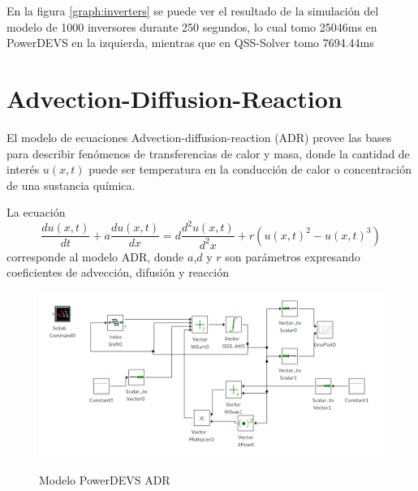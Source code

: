 En la figura \ref{graph:inverters} se puede ver el resultado de la simulación del modelo de 1000 inversores durante 250 segundos, lo cual tomo 25046ms en PowerDEVS en 
	la izquierda, mientras que en QSS-Solver tomo 7694.44ms	

\section{Advection-Diffusion-Reaction}
	El modelo de ecuaciones Advection-diffusion-reaction (ADR) provee las bases para describir fenómenos de transferencias de calor y masa, donde la cantidad de interés $u(x,t)$ puede ser temperatura en la conducción de calor o concentración de una sustancia química.

La ecuación 
\begin{equation*}
\frac{du(x,t)}{dt} + a \frac{du(x,t)}{dx} = d\frac{d^2u(x,t)}{d^2x} + r(u(x,t)^2 - u(x,t)^3)
\end{equation*}
corresponde al modelo ADR, donde $a$,$d$ y $r$ son parámetros expresando coeficientes de advección, difusión y reacción

\begin{figure}[H]
 \includegraphics[width=0.75\linewidth]{adr-pwd}
\label{model:adr}
\caption{Modelo PowerDEVS ADR}
\end{figure}

